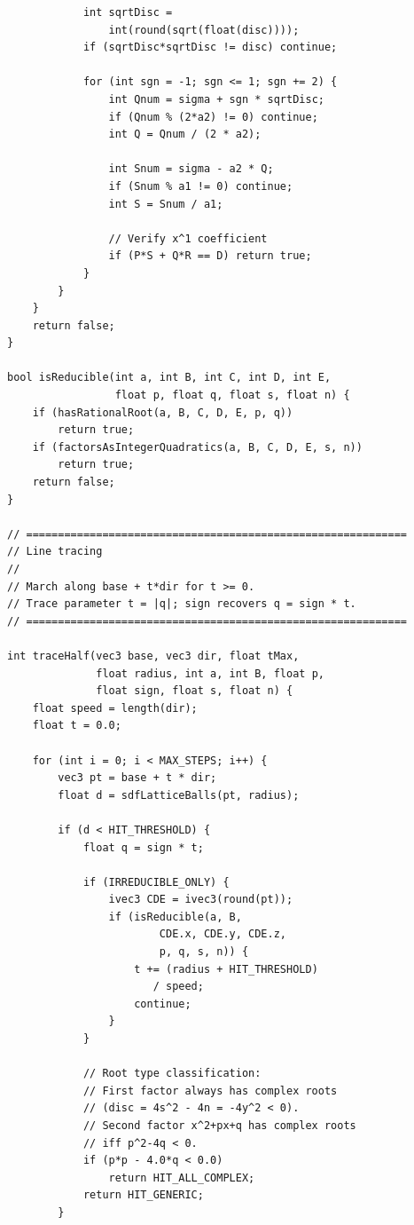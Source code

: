 \documentclass[11pt]{article}
\begin{document}
\begin{lstlisting}
            int sqrtDisc =
                int(round(sqrt(float(disc))));
            if (sqrtDisc*sqrtDisc != disc) continue;

            for (int sgn = -1; sgn <= 1; sgn += 2) {
                int Qnum = sigma + sgn * sqrtDisc;
                if (Qnum % (2*a2) != 0) continue;
                int Q = Qnum / (2 * a2);

                int Snum = sigma - a2 * Q;
                if (Snum % a1 != 0) continue;
                int S = Snum / a1;

                // Verify x^1 coefficient
                if (P*S + Q*R == D) return true;
            }
        }
    }
    return false;
}

bool isReducible(int a, int B, int C, int D, int E,
                 float p, float q, float s, float n) {
    if (hasRationalRoot(a, B, C, D, E, p, q))
        return true;
    if (factorsAsIntegerQuadratics(a, B, C, D, E, s, n))
        return true;
    return false;
}

// ============================================================
// Line tracing
//
// March along base + t*dir for t >= 0.
// Trace parameter t = |q|; sign recovers q = sign * t.
// ============================================================

int traceHalf(vec3 base, vec3 dir, float tMax,
              float radius, int a, int B, float p,
              float sign, float s, float n) {
    float speed = length(dir);
    float t = 0.0;

    for (int i = 0; i < MAX_STEPS; i++) {
        vec3 pt = base + t * dir;
        float d = sdfLatticeBalls(pt, radius);

        if (d < HIT_THRESHOLD) {
            float q = sign * t;

            if (IRREDUCIBLE_ONLY) {
                ivec3 CDE = ivec3(round(pt));
                if (isReducible(a, B,
                        CDE.x, CDE.y, CDE.z,
                        p, q, s, n)) {
                    t += (radius + HIT_THRESHOLD)
                       / speed;
                    continue;
                }
            }

            // Root type classification:
            // First factor always has complex roots
            // (disc = 4s^2 - 4n = -4y^2 < 0).
            // Second factor x^2+px+q has complex roots
            // iff p^2-4q < 0.
            if (p*p - 4.0*q < 0.0)
                return HIT_ALL_COMPLEX;
            return HIT_GENERIC;
        }


\end{lstlisting}
\end{document}
